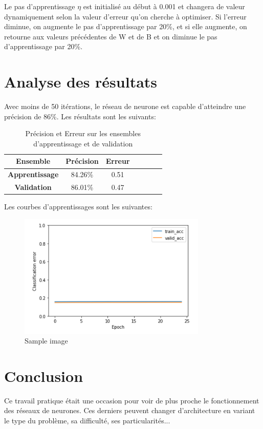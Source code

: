 \documentclass[a4paper,english,12pt]{article}
\begin{document}
Le pas d'apprentissage $\eta$ est initialisé au début à 0.001 et  changera de valeur dynamiquement selon la valeur d'erreur qu'on cherche à optimiser. Si l'erreur diminue, on augmente le pas d'apprentissage par 20\%, et si elle augmente, on retourne aux valeurs précédentes de W et de B et on diminue le pas d'apprentissage par 20\%.

\section{Analyse des résultats}
Avec moins de 50 itérations, le réseau de neurone est capable d'atteindre une précision de 86\%.  Les résultats sont les suivants:

\begin{table}[H]\centering
	\begin{tabular}{ccccccc}
		\toprule \textbf{Ensemble} & \textbf{Précision} & \textbf{Erreur}\\    \midrule
		\textbf{Apprentissage} & 84.26\% & 0.51
		\\    \midrule
		\textbf{Validation} & 86.01\% & 0.47  \\   
		\bottomrule	
	\end{tabular}
	\caption{Précision et Erreur sur les ensembles d'apprentissage et de validation\label{tab1}}
\end{table}

Les courbes d'apprentissages sont les suivantes:


\begin{figure}[H]
	\centering
	\includegraphics[width=0.8\textwidth,keepaspectratio]{Error}
	\caption{Sample image\label{img1}}
\end{figure}


\section{Conclusion}
Ce travail pratique était une occasion pour voir de plus proche le fonctionnement des réseaux de neurones. Ces derniers peuvent changer d'architecture en variant le type du problème, sa difficulté, ses particularités... 
\end{document}
